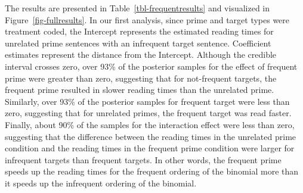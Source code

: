 \documentclass[
  12pt,
]{scrartcl}
\begin{document}
The results are presented in Table~\ref{tbl-frequentresults} and
visualized in Figure~\ref{fig-fullresults}. In our first analysis, since
prime and target types were treatment coded, the Intercept represents
the estimated reading times for unrelated prime sentences with an
infrequent target sentence. Coefficient estimates represent the distance
from the Intercept. Although the credible interval crosses zero, over
93\% of the posterior samples for the effect of frequent prime were
greater than zero, suggesting that for not-frequent targets, the
frequent prime resulted in slower reading times than the unrelated
prime. Similarly, over 93\% of the posterior samples for frequent target
were less than zero, suggesting that for unrelated primes, the frequent
target was read faster. Finally, about 90\% of the samples for the
interaction effect were less than zero, suggesting that the difference
between the reading times in the unrelated prime condition and the
reading times in the frequent prime condition were larger for infrequent
targets than frequent targets. In other words, the frequent prime speeds
up the reading times for the frequent ordering of the binomial more than
it speeds up the infrequent ordering of the binomial.

\begin{table}

\caption{\label{tbl-frequentresults}Results of the statistical model for
the frequent vs unrelated prime.}


\end{table}%
\end{document}

